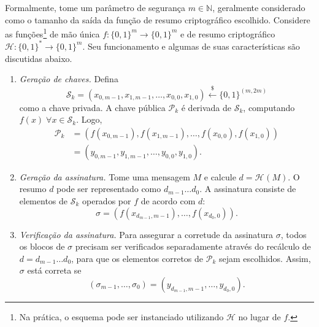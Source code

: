 \documentclass{ufsctex/ufsctex}
\newcommand{\hh}{\mathcal{H}}
\newcommand{\pk}{\mathcal{P}_{k}}
\newcommand{\sk}{\mathcal{S}_{k}}
\newcommand{\hash}[2][]{\mathcal{H}^{#1} (#2)}
\newcommand{\binwds}[1]{\{0, 1\}^{#1}}
\newcommand{\fhash}[1]{\hh{}: \binwds{*} \longrightarrow{} \binwds{#1}}
\newcommand{\random}{\stackrel{\$}{\longleftarrow}}
\begin{document}
Formalmente, tome um parâmetro de segurança $m \in \mathbb{N}$, geralmente
considerado como o tamanho da saída da função de resumo criptográfico
escolhido. Considere as funções\footnote{Na prática, o esquema pode ser
instanciado utilizando $\hh{}$ no lugar de $f$.} de mão única $f : \binwds{m}
\longrightarrow \binwds{m}$ e de resumo criptográfico $\fhash{m}$. Seu
funcionamento e algumas de suas características são discutidas abaixo.

\begin{enumerate}

  \item[] \emph{Geração de chaves.} Defina
      \begin{equation}
        \sk{} = (x_{0, m - 1}, x_{1, m - 1}, \dots, x_{0, 0}, x_{1, 0})
          \random{} \binwds{(m, 2m)}
      \end{equation}
        como a chave privada.\simbolo{$\random{}$}{Seleção aleatória} A chave
        pública $\pk{}$ é derivada de $\sk{}$,
        computando $f(x) \; \forall x \in \sk{}$. Logo,
        \begin{align}
          \pk{} &= (f(x_{0, m - 1}), f(x_{1, m - 1}),
            \dots, f(x_{0, 0}), f(x_{1, 0})) \\
                &= (y_{0, m - 1}, y_{1, m - 1},
            \dots, y_{0, 0}, y_{1, 0}).
        \end{align}

  \item[] \emph{Geração da assinatura.} Tome uma mensagem $M$ e calcule $d =
      \hash{M}$. O resumo $d$ pode ser representado como $d_{m - 1} \dots
        d_{0}$. A assinatura consiste de elementos de $\sk{}$ operados por $f$
        de acordo com $d$:
        \begin{equation}
          \sigma = (f(x_{d_{m - 1}, m - 1}), \dots, f(x_{d_{0}, 0})).
        \end{equation}

  \item[] \emph{Verificação da assinatura.} Para assegurar a corretude da
      assinatura $\sigma$, todos os blocos de $\sigma$ precisam ser verificados
        separadamente através do recálculo de $d = d_{m - 1} \dots d_{0}$, para
        que os elementos corretos de $\pk{}$ sejam escolhidos. Assim, $\sigma$
        está correta se
        \begin{equation}
          (\sigma_{m - 1}, \dots, \sigma_{0})
            = (y_{d_{m - 1}, m - 1}, \dots, y_{d_{0}, 0}).
        \end{equation}

\end{enumerate}
\end{document}
